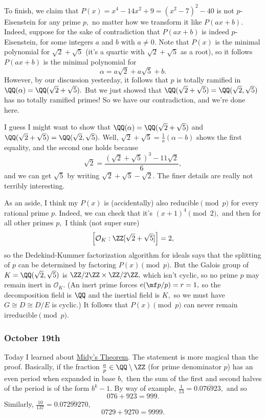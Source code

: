 To finish, we claim that $P(x)=\boxed{x^4-14x^2+9}=\left(x^2-7\right)^2-40$ is not $p$-Eisenstein for any prime $p,$ no matter how we transform it like $P(ax+b).$ Indeed, suppose for the sake of contradiction that $P(ax+b)$ is indeed $p$-Eisenstein, for some integers $a$ and $b$ with $a\ne0.$ Note that $P(x)$ is the minimal polynomial for $\sqrt2+\sqrt5$ (it's a quartic with $\sqrt2+\sqrt5$ as a root), so it follows $P(ax+b)$ is the minimal polynomial for
\[\alpha=a\sqrt2+a\sqrt5+b.\]
However, by our discussion yesterday, it follows that $p$ is totally ramified in $\QQ(\alpha)=\QQ(\sqrt2+\sqrt5).$ But we just showed that $\QQ(\sqrt2+\sqrt5)=\QQ(\sqrt2,\sqrt5)$ has no totally ramified primes! So we have our contradiction, and we're done here.

I guess I might want to show that $\QQ(\alpha)=\QQ(\sqrt2+\sqrt5)$ and $\QQ(\sqrt2+\sqrt5)=\QQ(\sqrt2,\sqrt5).$ Well, $\sqrt2+\sqrt5=\frac1a(\alpha-b)$ shows the first equality, and the second one holds because
\[\sqrt2=\frac{(\sqrt2+\sqrt5)^3-11\sqrt2}6,\]
and we can get $\sqrt5$ by writing $\sqrt2+\sqrt5-\sqrt2.$ The finer details are really not terribly interesting.

As an aside, I think my $P(x)$ is (accidentally) also reducible$\pmod p$ for every rational prime $p.$ Indeed, we can check that it's $(x+1)^4\pmod2,$ and then for all other primes $p,$ I think (not super sure)
\[\left[\mathcal O_K:\ZZ[\sqrt2+\sqrt5]\right]=2,\]
so the Dedekind-Kummer factorization algorithm for ideals says that the splitting of $p$ can be determined by factoring $P(x)\pmod p.$ But the Galois group of $K=\QQ(\sqrt2,\sqrt5)$ is $\ZZ/2\ZZ\times\ZZ/2\ZZ,$ which isn't cyclic, so no prime $p$ may remain inert in $\mathcal O_K.$ (An inert prime forces $e(\mf p/p)=r=1,$ so the decomposition field is $\QQ$ and the inertial field is $K,$ so we must have $G\cong D\cong D/E$ is cyclic.)  It follows that $P(x)\pmod p$ can never remain irreducible$\pmod p.$

\subsubsection{October 19th}
Today I learned about \href{https://en.wikipedia.org/wiki/Midy's_theorem}{Midy's Theorem}. The statement is more magical than the proof. Basically, if the fraction $\frac ap\in\QQ\setminus\ZZ$ (for prime denominator $p$) has an even period when expanded in base $b,$ then the sum of the first and second halves of the period is of the form $b^k-1.$ By way of example, $\frac1{13}=0.\overline{076923},$ and so
\[076+923=\boxed{999}.\]
Similarly, $\frac{10}{137}=0.\overline{07299270},$
\[0729+9270=\boxed{9999}.\]

